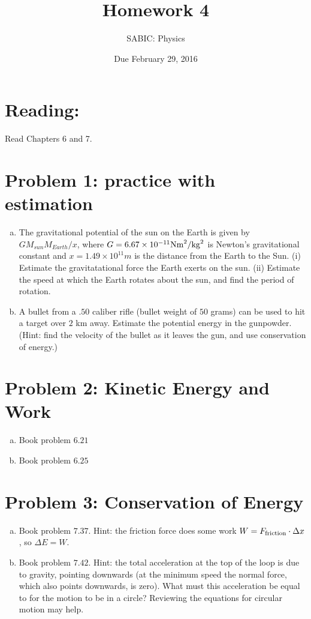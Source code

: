 \documentclass[10pt,letter]{article}
\begin{document}


\title{Homework 4}

\author{SABIC: Physics}

\date{Due February 29, 2016}
 
\maketitle 

\section*{Reading:}
Read Chapters 6 and 7.
\section*{Problem 1: practice with estimation}
\begin{enumerate}[(a)]
\item The gravitational potential of the sun on the Earth is given by $GM_{sun}M_{Earth}/x$, where $G =6.67 \times 10^{-11} {\rm N m}^2/{\rm kg}^2$ is Newton's gravitational constant and $x = 1.49 \times 10^11 m$ is the distance from the Earth to the Sun. (i) Estimate the gravitatational force the Earth exerts on the sun. (ii) Estimate the speed at which the Earth rotates about the sun, and find the period of rotation.
\item A bullet from a $.50$ caliber rifle (bullet weight of $50$ grams) can be used to hit a target over $2$ km away. Estimate the potential energy in the gunpowder. (Hint: find the velocity of the bullet as it leaves the gun, and use conservation of energy.)
\end{enumerate}
\section*{Problem 2: Kinetic Energy and Work }
\begin{enumerate}[(a)]
\item Book problem $6.21$
\item Book problem $6.25$
\end{enumerate}
\section*{Problem 3: Conservation of Energy}
\begin{enumerate}[(a)]
\item Book problem $7.37$. Hint: the friction force does some work $W = F_{\rm friction} \cdot \Delta x$, so $\Delta E = W$.
\item Book problem $7.42$. Hint: the total acceleration at the top of the loop is due to gravity, pointing downwards (at the minimum speed the normal force, which also points downwards, is zero). What must this acceleration be equal to for the motion to be in a circle? Reviewing the equations for circular motion may help.
\end{enumerate}
\end{document}
